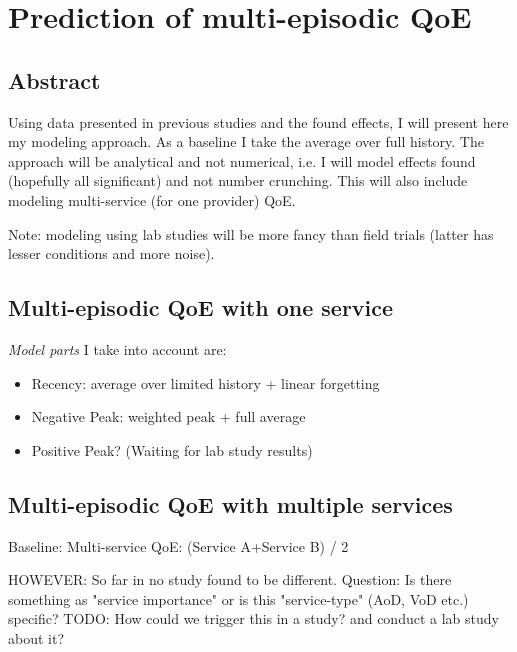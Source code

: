 \chapter{Prediction of multi-episodic QoE}\label{chap:08}
\section*{Abstract}
Using data presented in previous studies and the found effects, I will present here my modeling approach.
As a baseline I take the average over full history.
The approach will be analytical and not numerical, i.e. I will model effects found (hopefully all significant) and not number crunching.
This will also include modeling multi-service (for one provider) QoE.

Note: modeling using lab studies will be more fancy than field trials (latter has lesser conditions and more noise).

\section{Multi-episodic QoE with one service}
\textit{Model parts} I take into account are:
\begin{itemize}
\item Recency: average over limited history + linear forgetting
\item Negative Peak: weighted peak + full average
\item Positive Peak? (Waiting for lab study results)
\end{itemize}

\section{Multi-episodic QoE with multiple services}
Baseline: Multi-service QoE: (Service A+Service B) / 2

HOWEVER: So far in no study found to be different.
Question: Is there something as "service importance" or is this "service-type" (AoD, VoD etc.) specific?
TODO: How could we trigger this in a study? and conduct a lab study about it?
